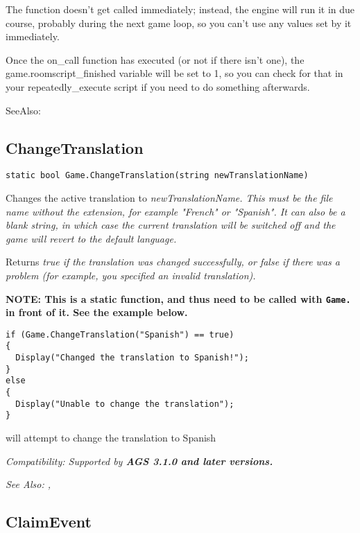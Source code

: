 The function doesn't get called immediately; instead, the engine will run it in due course,
probably during the next game loop, so you can't use any values set by it immediately.

Once the on_call function has executed (or not if there isn't one), the
game.roomscript_finished  variable will be set to 1, so you can check for that in your
repeatedly_execute script if you need to do something afterwards.

SeeAlso: 


\subsection{ChangeTranslation}\label{Game.ChangeTranslation}%

\begin{verbatim}
static bool Game.ChangeTranslation(string newTranslationName)
\end{verbatim}
Changes the active translation to \it{newTranslationName}. This must be the file name without
the extension, for example "French" or "Spanish". It can also be a blank string, in which case
the current translation will be switched off and the game will revert to the default language.

Returns \it{true} if the translation was changed successfully, or \it{false} if there was a
problem (for example, you specified an invalid translation).

\bf{NOTE:} This is a static function, and thus need to be called with \verb$Game.$ in front of it. See
the example below.

\begin{verbatim}
if (Game.ChangeTranslation("Spanish") == true)
{
  Display("Changed the translation to Spanish!");
}
else
{
  Display("Unable to change the translation");
}
\end{verbatim}
will attempt to change the translation to Spanish

\it{Compatibility:} Supported by \bf{AGS 3.1.0} and later versions.

\it{See Also:} ,


\subsection{ClaimEvent}\label{ClaimEvent}%

